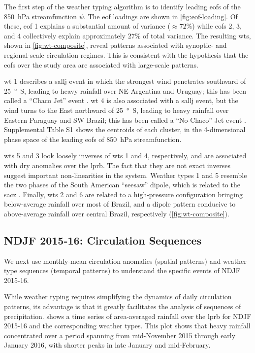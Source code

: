 \documentclass{ametsoc}
\begin{document}
The first step of the weather typing algorithm is to identify leading \glspl{eof} of the \SI{850}{\hecto\pascal} streamfunction $\psi$.
The \gls{eof} loadings are shown in \cref{fig:eof-loading}.
Of these, \gls{eof} 1 explains a substantial amount of variance ($\approx 72\%$) while \glspl{eof} 2, 3, and 4 collectively explain approximately $27\%$ of total variance.
The resulting \glspl{wt}, shown in \cref{fig:wt-composite}, reveal patterns associated with synoptic- and regional-scale circulation regimes.
This is consistent with the hypothesis that the \glspl{eof} over the study area are associated with large-scale patterns.

\Gls{wt} 1 describes a \gls{sallj} event in which the strongest wind penetrates southward of \SI{25}{\degree S}, leading to heavy rainfall over NE Argentina and Uruguay; this has been called a ``Chaco Jet'' event \citep{Salio2002}.
\Gls{wt} 4 is also associated with a \gls{sallj} event, but the wind turns to the East northward of \SI{25}{\degree S}, leading to heavy rainfall over Eastern Paraguay and SW Brazil; this has been called a ``No-Chaco'' Jet event \citep{Vera2006}.
Supplemental Table S1 shows the centroids of each cluster, in the 4-dimensional phase space of the leading \glspl{eof} of \SI{850}{\hecto\pascal} streamfunction.

\Glspl{wt} 5 and 3 look loosely inverses of \glspl{wt} 1 and 4, respectively, and are associated with dry anomalies over the \gls{lprb}.
The fact that they are not exact inverses suggest important non-linearities in the system.
Weather types 1 and 5 resemble the two phases of the South American ``seesaw'' dipole, which is related to the \gls{sacz} \citep{Nogues-Paegle1997}.
Finally, \glspl{wt} 2 and 6 are related to a high-pressure configuration bringing below-average rainfall over most of Brazil, and a dipole pattern conducive to above-average rainfall over central Brazil, respectively (\cref{fig:wt-composite}).

\subsection{NDJF 2015-16: Circulation Sequences}

We next use monthly-mean circulation anomalies (spatial patterns) and weather type sequences (temporal patterns) to understand the specific events of NDJF 2015-16.

While weather typing requires simplifying the dynamics of daily circulation patterns, its advantage is that it greatly facilitates the analysis of sequences of precipitation.
 shows a time series of area-averaged rainfall over the \gls{lprb} for NDJF 2015-16 and the corresponding weather types.
This plot shows that heavy rainfall concentrated over a period spanning from mid-November 2015 through early January 2016, with shorter peaks in late January and mid-February.
\end{document}
